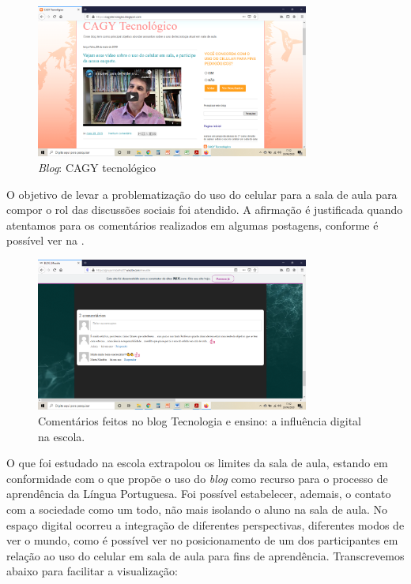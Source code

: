 \documentclass{textolivre}
\begin{document}
\begin{figure}[h]
    \centering
    \includegraphics[width=0.8\textwidth]{figure03.png}
    \caption{\emph{Blog}: CAGY tecnológico}
    \label{fig03}
\end{figure}

O objetivo de levar a problematização do uso do celular para a sala de aula para compor o rol das discussões sociais foi atendido. A afirmação é justificada quando atentamos para os comentários realizados em algumas postagens, conforme é possível ver na .

\begin{figure}[h]
    \centering
    \includegraphics[width=0.8\textwidth]{figure04.png}
    \caption{Comentários feitos no blog Tecnologia e ensino: a influência digital na escola.}
    \label{fig04}
\end{figure}

O que foi estudado na escola extrapolou os limites da sala de aula, estando em conformidade com o que propõe o uso do \emph{blog} como recurso para o processo de aprendência da Língua Portuguesa. Foi possível estabelecer, ademais, o contato com a sociedade como um todo, não mais isolando o aluno na sala de aula. No espaço digital ocorreu a integração de diferentes perspectivas, diferentes modos de ver o mundo, como é possível ver no posicionamento de um dos participantes em relação ao uso do celular em sala de aula para fins de aprendência. Transcrevemos abaixo para facilitar a visualização:
\end{document}

